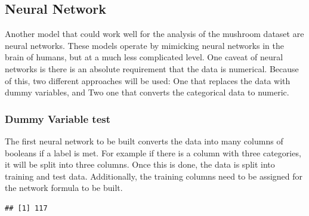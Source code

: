 \documentclass[
  english,
  man]{apa6}
\newenvironment{Shaded}{\begin{snugshade}}{\end{snugshade}}
\newcommand{\CommentTok}[1]{\textcolor[rgb]{0.56,0.35,0.01}{\textit{#1}}}
\newcommand{\DataTypeTok}[1]{\textcolor[rgb]{0.13,0.29,0.53}{#1}}
\newcommand{\KeywordTok}[1]{\textcolor[rgb]{0.13,0.29,0.53}{\textbf{#1}}}
\newcommand{\NormalTok}[1]{#1}
\newcommand{\OperatorTok}[1]{\textcolor[rgb]{0.81,0.36,0.00}{\textbf{#1}}}
\newcommand{\StringTok}[1]{\textcolor[rgb]{0.31,0.60,0.02}{#1}}
\begin{document}
\hypertarget{neural-network}{%
\subsection{Neural Network}\label{neural-network}}

Another model that could work well for the analysis of the mushroom dataset are neural networks. These models operate by mimicking neural networks in the brain of humans, but at a much less complicated level. One caveat of neural networks is there is an absolute requirement that the data is numerical. Because of this, two different approaches will be used: One that replaces the data with dummy variables, and Two one that converts the categorical data to numeric.

\hypertarget{dummy-variable-test}{%
\subsubsection{Dummy Variable test}\label{dummy-variable-test}}

The first neural network to be built converts the data into many columns of booleans if a label is met. For example if there is a column with three categories, it will be split into three columns. Once this is done, the data is split into training and test data. Additionally, the training columns need to be assigned for the network formula to be built.

\begin{Shaded}
\end{Shaded}

\begin{verbatim}
## [1] 117
\end{verbatim}
\end{document}

